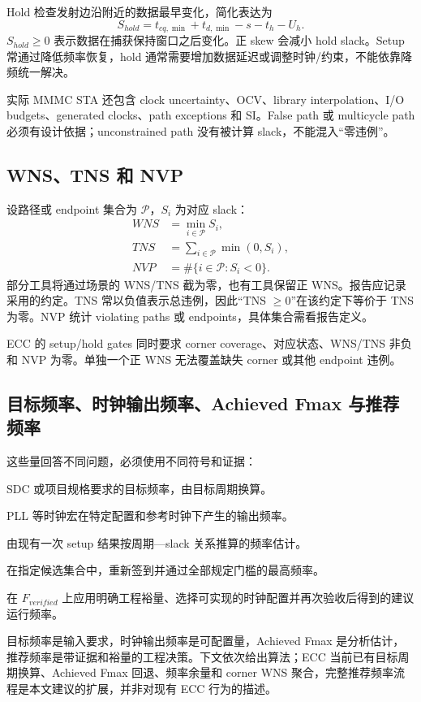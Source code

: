 \documentclass[UTF8,a4paper,11pt,fontset=fandol]{ctexart}
\numberwithin{equation}{section}
\begin{document}
Hold 检查发射边沿附近的数据最早变化，简化表达为
\begin{equation}
S_{hold}=t_{cq,\min}+t_{d,\min}-s-t_h-U_h.
\end{equation}
$S_{hold}\ge0$ 表示数据在捕获保持窗口之后变化。正 skew 会减小 hold slack。Setup 常通过降低频率恢复，hold 通常需要增加数据延迟或调整时钟/约束，不能依靠降频统一解决\cite{weste,sdc}。

实际 MMMC STA 还包含 clock uncertainty、OCV、library interpolation、I/O budgets、generated clocks、path exceptions 和 SI。False path 或 multicycle path 必须有设计依据；unconstrained path 没有被计算 slack，不能混入“零违例”。

\subsection{WNS、TNS 和 NVP}

设路径或 endpoint 集合为 $\mathcal{P}$，$S_i$ 为对应 slack：
\begin{align}
WNS&=\min_{i\in\mathcal{P}}S_i,\\
TNS&=\sum_{i\in\mathcal{P}}\min(0,S_i),\\
NVP&=\#\{i\in\mathcal{P}:S_i<0\}.
\end{align}
部分工具将通过场景的 WNS/TNS 截为零，也有工具保留正 WNS。报告应记录采用的约定。TNS 常以负值表示总违例，因此“TNS $\ge0$”在该约定下等价于 TNS 为零。NVP 统计 violating paths 或 endpoints，具体集合需看报告定义。

ECC 的 setup/hold gates 同时要求 corner coverage、对应状态、WNS/TNS 非负和 NVP 为零。单独一个正 WNS 无法覆盖缺失 corner 或其他 endpoint 违例。

\subsection{目标频率、时钟输出频率、Achieved Fmax 与推荐频率}

这些量回答不同问题，必须使用不同符号和证据：
\begin{description}[style=nextline,leftmargin=3.0cm,labelwidth=2.8cm]
  \item[$F_{target}$] SDC 或项目规格要求的目标频率，由目标周期换算。
  \item[$F_{OUT}$] PLL 等时钟宏在特定配置和参考时钟下产生的输出频率。
  \item[$F_{achieved}$] 由现有一次 setup 结果按周期—slack 关系推算的频率估计。
  \item[$F_{verified}$] 在指定候选集合中，重新签到并通过全部规定门槛的最高频率。
  \item[$F_{recommended}$] 在 $F_{verified}$ 上应用明确工程裕量、选择可实现的时钟配置并再次验收后得到的建议运行频率。
\end{description}
目标频率是输入要求，时钟输出频率是可配置量，Achieved Fmax 是分析估计，推荐频率是带证据和裕量的工程决策。下文依次给出算法；ECC 当前已有目标周期换算、Achieved Fmax 回退、频率余量和 corner WNS 聚合，完整推荐频率流程是本文建议的扩展，并非对现有 ECC 行为的描述。
\end{document}
